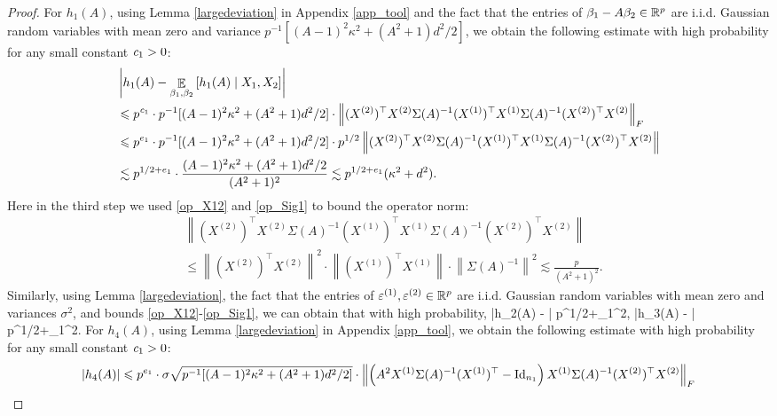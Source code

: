 \begin{proof}
For $h_1(A)$, using Lemma \ref{largedeviation} in Appendix \ref{app_tool} and the fact that the entries of $\beta_1-A\beta_2\in \mathbb{R}^p$ are i.i.d. Gaussian random variables with mean zero and variance $p^{-1}[(A-1)^2\kappa^2 + (A^2+1)d^2/2]$, we obtain the following estimate with high probability for any small constant ${\mathit{c}}_1>0$:
\begin{align}
&\left|h_1(A) - \mathop{\mathbb{E}}_{\beta_1,\beta_2}\left[ h_1(A) \mid X_1, X_2 \right]\right|\nonumber \\
&\leqslant p^{{\mathit{c}}_1}\cdot p^{-1}[(A-1)^2\kappa^2 + (A^2+1)d^2/2]\cdot \left\| (X^{(2)})^\top X^{(2)}  \Sigma(A)^{-1}  (X^{(1)})^\top X^{(1)} \Sigma(A)^{-1} (X^{(2)})^\top X^{(2)} \right\|_F \nonumber\\
&\leqslant p^{e_1}\cdot p^{-1}[(A-1)^2\kappa^2 + (A^2+1)d^2/2]\cdot p^{1/2} \left\| (X^{(2)})^\top X^{(2)}  \Sigma(A)^{-1}  (X^{(1)})^\top X^{(1)} \Sigma(A)^{-1} (X^{(2)})^\top X^{(2)} \right\| \nonumber \\
&\lesssim p^{1/2+e_1}\cdot \frac{(A-1)^2\kappa^2 + (A^2+1)d^2/2}{(A^2+1)^2}\lesssim p^{1/2+e_1}(\kappa^2 + d^2).\label{eq_hA1}
\end{align}
 Here in the third step we used \eqref{op_X12} and \eqref{op_Sig1} to bound the operator norm:
\begin{align*}
&\left\| (X^{(2)})^\top X^{(2)}  \Sigma(A)^{-1}  (X^{(1)})^\top X^{(1)} \Sigma(A)^{-1} (X^{(2)})^\top X^{(2)} \right\| \\
&\le \left\| (X^{(2)})^\top X^{(2)}\right\|^2 \cdot \left\| (X^{(1)})^\top X^{(1)}\right\|\cdot \left\| \Sigma(A)^{-1} \right\|^2 \lesssim \frac{p}{(A^2+1)^2}.
\end{align*}  
Similarly, using Lemma \ref{largedeviation}, the fact that the entries of $\varepsilon^{(1)},\varepsilon^{(2)}\in \mathbb{R}^p$ are i.i.d. Gaussian random variables with mean zero and variances $\sigma^2$, and bounds \eqref{op_X12}-\eqref{op_Sig1}, we can obtain that with high probability,
\be\label{eq_hA23}\left|h_2(A) - \right| \lesssim p^{1/2+\e_1}\sigma^2, \quad \left|h_3(A) - \right| \lesssim p^{1/2+\e_1}\sigma^2.\ee
For $h_4(A)$, using Lemma \ref{largedeviation} in Appendix \ref{app_tool}, we obtain the following estimate with high probability for any small constant ${\mathit{c}}_1>0$:
\begin{align}
\left|h_4(A)\right| &\le p^{e_1}\cdot \sigma \sqrt{p^{-1}[(A-1)^2\kappa^2 + (A^2+1)d^2/2]}\cdot \left\| \left(A^2 X^{(1)}\Sigma(A)^{-1} (X^{(1)})^\top-\id_{n_1}\right) X^{(1)} \Sigma(A)^{-1} (X^{(2)})^\top X^{(2)} \right\|_F\nonumber \\

\end{align}
\end{proof}
